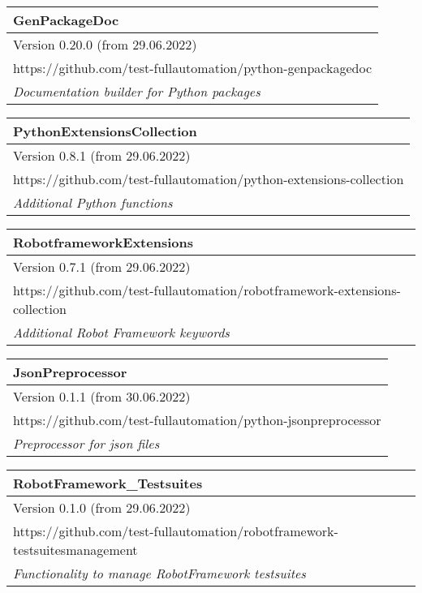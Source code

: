 \begin{center}
\begin{tabular}{| m{44em} |}\hline
   \textbf{GenPackageDoc}\\ \hline
   Version 0.20.0 (from 29.06.2022)\\ \hline
   https://github.com/test-fullautomation/python-genpackagedoc\\ \hline
   \textit{Documentation builder for Python packages}\\ \hline
\end{tabular}

\vspace{2ex}

\begin{tabular}{| m{44em} |}\hline
   \textbf{PythonExtensionsCollection}\\ \hline
   Version 0.8.1 (from 29.06.2022)\\ \hline
   https://github.com/test-fullautomation/python-extensions-collection\\ \hline
   \textit{Additional Python functions}\\ \hline
\end{tabular}

\vspace{2ex}

\begin{tabular}{| m{44em} |}\hline
   \textbf{RobotframeworkExtensions}\\ \hline
   Version 0.7.1 (from 29.06.2022)\\ \hline
   https://github.com/test-fullautomation/robotframework-extensions-collection\\ \hline
   \textit{Additional Robot Framework keywords}\\ \hline
\end{tabular}

\vspace{2ex}

\begin{tabular}{| m{44em} |}\hline
   \textbf{JsonPreprocessor}\\ \hline
   Version 0.1.1 (from 30.06.2022)\\ \hline
   https://github.com/test-fullautomation/python-jsonpreprocessor\\ \hline
   \textit{Preprocessor for json files}\\ \hline
\end{tabular}

\vspace{2ex}

\begin{tabular}{| m{44em} |}\hline
   \textbf{RobotFramework\_Testsuites}\\ \hline
   Version 0.1.0 (from 29.06.2022)\\ \hline
   https://github.com/test-fullautomation/robotframework-testsuitesmanagement\\ \hline
   \textit{Functionality to manage RobotFramework testsuites}\\ \hline
\end{tabular}

\vspace{2ex}

\end{center}

